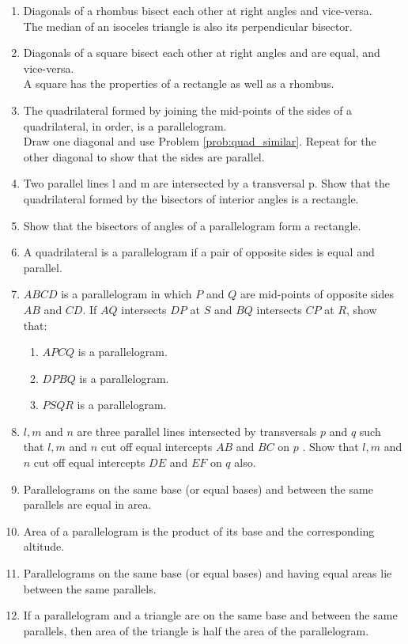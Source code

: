 \begin{enumerate}[label=\arabic*.,ref=\thesubsection.\theenumi]
%
\item  Diagonals of a rhombus bisect each other at right angles and vice-versa. 
%
\\
\solution The median of an isoceles triangle is also its perpendicular bisector.
%
\item  Diagonals of a square bisect each other at right angles and are equal, and vice-versa. 
%
\\
\solution A square has the properties of a rectangle as well as a rhombus.
%
%
\item  The quadrilateral formed by joining the mid-points of the sides of a quadrilateral, in order, is a parallelogram.
%
\\
\solution Draw one diagonal and use Problem \eqref{prob:quad_similar}.  Repeat for the other diagonal to show that the sides are parallel.
%
\item Two parallel lines l and m are intersected by a transversal p. Show that the quadrilateral formed by the bisectors of interior angles is a rectangle.
%
\item Show that the bisectors of angles of a parallelogram form a rectangle.
%
\item A quadrilateral is a parallelogram if a pair of opposite sides is equal and parallel.
%
\item $ABCD$ is a parallelogram in which $P$ and $Q$ are mid-points of opposite sides $AB$ and $CD$. If $AQ$ intersects $DP$ at $S$ and $BQ$ intersects $CP$ at $R$, show that: 
%
\begin{enumerate}
\item  $APCQ$ is a parallelogram. 
\item $DPBQ$ is a parallelogram. 
\item $PSQR$ is a parallelogram.
\end{enumerate}
%
\item $l, m$ and $n$ are three parallel lines intersected by transversals $p$ and $q$ such that $l, m$ and $n$ cut off equal intercepts $AB$ and $BC$ on $p$ . Show that $l, m$ and $n$ cut off equal intercepts $DE$ and $EF$ on $q$ also.
%
\item Parallelograms on the same base (or equal bases) and between the same parallels are equal in area.
\item Area of a parallelogram is the product of its base and the corresponding altitude. 
\item Parallelograms on the same base (or equal bases) and having equal areas lie between the same parallels.
\item If a parallelogram and a triangle are on the same base and between the same parallels, then area of the triangle is half the area of the parallelogram.

\end{enumerate}
